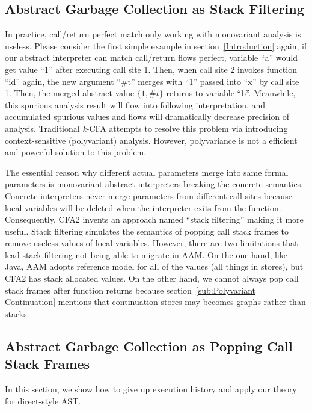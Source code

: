 \documentclass{article}
\begin{document}
\subsection{Abstract Garbage Collection as Stack Filtering}
\label{sub:Abstract Garbage Collection as Stack Filtering}
In practice, call/return perfect match only working with monovariant analysis is useless. Please consider the first simple example in section~\ref{Introduction} again, if our abstract interpreter can match call/return flows perfect, variable ``a'' would get value ``1'' after executing call site 1. Then, when call site 2 invokes function ``id'' again, the new argument ``\#t'' merges with ``1'' passed into ``x'' by call site 1. Then, the merged abstract value $\{1, \#t\}$ returns to variable ``b''.
Meanwhile, this spurious analysis result will flow into following interpretation, and accumulated spurious values and flows will dramatically decrease precision of analysis.
Traditional \textit{k}-CFA attempts to resolve this problem via introducing context-sensitive (polyvariant) analysis. However, polyvariance is not a efficient and powerful solution to this problem.

The essential reason why different actual parameters merge into same formal parameters is monovariant abstract interpreters breaking the concrete semantics. Concrete interpreters never merge parameters from different call sites because local variables will be deleted when the interpreter exits from the function.
Consequently, CFA2 invents an approach named ``stack filtering'' making it more useful. Stack filtering simulates the semantics of popping call stack frames to remove useless values of local variables. However, there are two limitations that lead stack filtering not being able to migrate in AAM\@. On the one hand, like Java, AAM adopts reference model for all of the values (all things in stores), but CFA2 has stack allocated values. On the other hand, we cannot always pop call stack frames after function returns because section~\ref{sub:Polyvariant Continuation} mentions that continuation stores may becomes graphs rather than stacks.
\subsection{Abstract Garbage Collection as Popping Call Stack Frames}
\label{sub:Abstract Garbage Collection as Popping Call Stack Frames}
In this section, we show how to give up execution history and apply our theory for direct-style AST\@.
\end{document}
